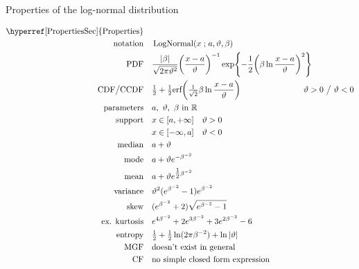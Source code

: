 

\begin{table*}[t!]
\caption[Log-normal distribution -- Properties]{Properties of the log-normal distribution}
 \begin{align*}
\text{\hyperref[PropertiesSec]{Properties}}  \quad& \\
\text{notation} \quad & \op{LogNormal}(x\given a, \vartheta,\beta ) \checked  	
\\
\text{PDF}\quad &   \frac{|\beta|}{\sqrt{2\pi \vartheta^2}} \Left(\frac{x-a}{\vartheta}\Right)^{-1} \exp\Left\{-\frac{1}{2} \Left( \beta \ln \frac{x-a}{\vartheta} \Right)^2 \Right\}	\checked					
\\
\text{CDF} \big/ \text{CCDF} \quad  &   \tfrac{1}{2} +  \tfrac{1}{2}\text{erf}\Left( \sfrac{1}{\sqrt{2}} \beta \ln \frac{x-a}{\vartheta} \Right) \checked
& \hspace{-2em} \vartheta >0 \ \big/ \ \vartheta <0
\\
\text{parameters}\quad &   a,\  \vartheta,\ \beta \text{ in } \Real		 \checked
\\
\text{support} \quad &   x \in [a, +\infty] \quad \vartheta>0 \checked
\\
& x \in [-\infty,a] \quad \vartheta<0 \checked
\\
\text{median} \quad  &  a+ \vartheta \checked
\\
\text{mode} \quad  & a+ \vartheta e^{-\beta^{-2}} \checked
\\
\text{mean} \quad  &  a + \vartheta e^{\tfrac{1}{2} \beta^{-2}} \checked
\\
\text{variance} \quad  & \vartheta^2 (e^{\beta^{-2}} -1) e^{\beta^{-2}} \checked
\\
\text{skew} \quad  &  ( e^{\beta^{-2}} +2) \sqrt{e^{\beta^{-2}} -1} \checked
\\
\text{ex. kurtosis} \quad  &  e^{4\beta^{-2}} +2e^{3\beta^{-2}} +3e^{2\beta^{-2}} -6 \checked
\\
\text{entropy} \quad  & \tfrac{1}{2} + \tfrac{1}{2} \ln(2\pi\beta^{-2}) + \ln | \vartheta | \checked
\\
\text{MGF} \quad  &  \text{doesn't exist in general} \checked
\\
\text{CF} \quad  &  \text{no simple closed form expression} \checked
\end{align*}
\end{table*}
